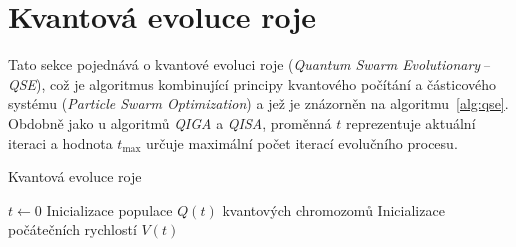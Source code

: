 \section{Kvantová evoluce roje}\label{sec:qse}
Tato sekce pojednává o kvantové evoluci roje (\emph{Quantum Swarm Evolutionary\,--\,QSE}), což je algoritmus kombinující principy kvantového počítání a částicového systému (\emph{Particle Swarm Optimization}) a jež je znázorněn na algoritmu~\ref{alg:qse}. 
Obdobně jako u algoritmů \emph{QIGA} a \emph{QISA}, proměnná $t$ reprezentuje aktuální iteraci a hodnota $t_{\text{max}}$ určuje maximální počet iterací evolučního procesu.

\begin{algorithm}[ht]
    \caption{Kvantová evoluce roje~\cite{qse}}
    \label{alg:qse}
    $t \gets 0$\;
    Inicializace populace $Q\left(t\right)$ kvantových chromozomů\;
    Inicializace počátečních rychlostí $V\left(t\right)$\;
\end{algorithm}

